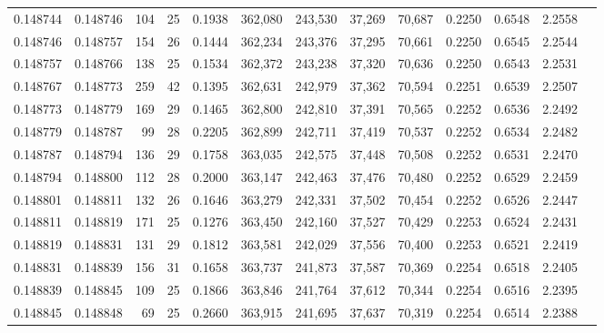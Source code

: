 \begin{tabular}{rrrrrrrrrrrrr}
0.148744 & 0.148746 & 104 &  25 &                                     0.1938 & 362,080 & 243,530 &  37,269 &  70,687 & 0.2250 & 0.6548 & 2.2558 \\
0.148746 & 0.148757 & 154 &  26 &                                     0.1444 & 362,234 & 243,376 &  37,295 &  70,661 & 0.2250 & 0.6545 & 2.2544 \\
0.148757 & 0.148766 & 138 &  25 &                                     0.1534 & 362,372 & 243,238 &  37,320 &  70,636 & 0.2250 & 0.6543 & 2.2531 \\
0.148767 & 0.148773 & 259 &  42 &                                     0.1395 & 362,631 & 242,979 &  37,362 &  70,594 & 0.2251 & 0.6539 & 2.2507 \\
0.148773 & 0.148779 & 169 &  29 &                                     0.1465 & 362,800 & 242,810 &  37,391 &  70,565 & 0.2252 & 0.6536 & 2.2492 \\
0.148779 & 0.148787 &  99 &  28 &                                     0.2205 & 362,899 & 242,711 &  37,419 &  70,537 & 0.2252 & 0.6534 & 2.2482 \\
0.148787 & 0.148794 & 136 &  29 &                                     0.1758 & 363,035 & 242,575 &  37,448 &  70,508 & 0.2252 & 0.6531 & 2.2470 \\
0.148794 & 0.148800 & 112 &  28 &                                     0.2000 & 363,147 & 242,463 &  37,476 &  70,480 & 0.2252 & 0.6529 & 2.2459 \\
0.148801 & 0.148811 & 132 &  26 &                                     0.1646 & 363,279 & 242,331 &  37,502 &  70,454 & 0.2252 & 0.6526 & 2.2447 \\
0.148811 & 0.148819 & 171 &  25 &                                     0.1276 & 363,450 & 242,160 &  37,527 &  70,429 & 0.2253 & 0.6524 & 2.2431 \\
0.148819 & 0.148831 & 131 &  29 &                                     0.1812 & 363,581 & 242,029 &  37,556 &  70,400 & 0.2253 & 0.6521 & 2.2419 \\
0.148831 & 0.148839 & 156 &  31 &                                     0.1658 & 363,737 & 241,873 &  37,587 &  70,369 & 0.2254 & 0.6518 & 2.2405 \\
0.148839 & 0.148845 & 109 &  25 &                                     0.1866 & 363,846 & 241,764 &  37,612 &  70,344 & 0.2254 & 0.6516 & 2.2395 \\
0.148845 & 0.148848 &  69 &  25 &                                     0.2660 & 363,915 & 241,695 &  37,637 &  70,319 & 0.2254 & 0.6514 & 2.2388 \\

\end{tabular}
